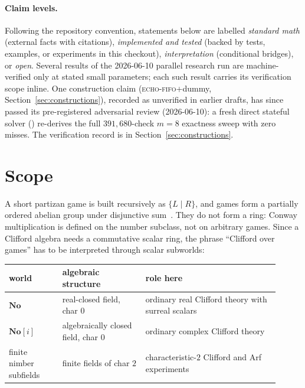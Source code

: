 \documentclass[11pt]{article}
\theoremstyle{plain}
\theoremstyle{definition}
\newcommand{\No}{\mathbf{No}}
\begin{document}
\paragraph{Claim levels.}
Following the repository convention, statements below are labelled
\emph{standard math} (external facts with citations), \emph{implemented and
tested} (backed by tests, examples, or experiments in this checkout),
\emph{interpretation} (conditional bridges), or \emph{open}. Several results
of the 2026-06-10 parallel research run are machine-verified only at stated
small parameters; each such result carries its verification scope inline.
One construction claim (\textsc{echo}-\textsc{fifo}+dummy,
Section~\ref{sec:constructions}), recorded as unverified in earlier drafts,
has since passed its pre-registered adversarial review (2026-06-10): a fresh
direct stateful solver () re-derives the
full $391{,}680$-check $m=8$ exactness sweep with zero misses. The
verification record is in Section~\ref{sec:constructions}.

\section{Scope}\label{sec:scope}

A short partizan game is built recursively as $\{L\mid R\}$, and games form a
partially ordered abelian group under disjunctive sum~\cite{Conway76,WW}. They
do not form a ring: Conway multiplication is defined on the number subclass,
not on arbitrary games. Since a Clifford algebra needs a commutative scalar
ring, the phrase ``Clifford over games'' has to be interpreted through scalar
subworlds:

\begin{center}
\begin{tabular}{@{}>{\raggedright\arraybackslash}p{0.18\linewidth}
>{\raggedright\arraybackslash}p{0.28\linewidth}
>{\raggedright\arraybackslash}p{0.45\linewidth}@{}}
\toprule
world & algebraic structure & role here \\
\midrule
$\No$ & real-closed field, char $0$ & ordinary real Clifford theory with surreal scalars \\
$\No[i]$ & algebraically closed field, char $0$ & ordinary complex Clifford theory \\
finite nimber subfields & finite fields of char $2$ & characteristic-$2$ Clifford and Arf experiments \\
\bottomrule
\end{tabular}
\end{center}
\end{document}
